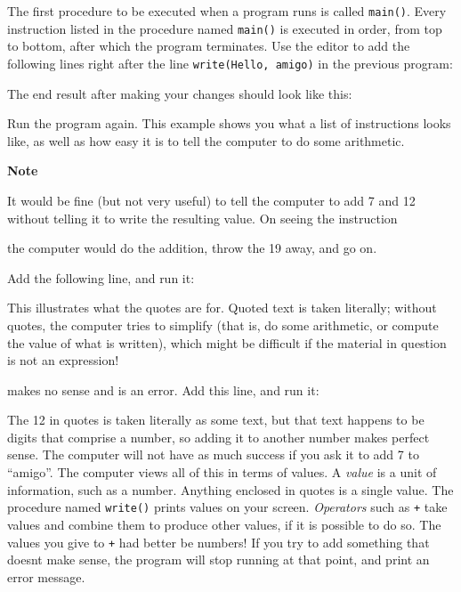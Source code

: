 The first procedure to be executed when a program runs is called
\texttt{main()}. Every instruction listed in the procedure named
\texttt{main()} is executed in order, from top to bottom, after which
the program terminates. Use the editor to add the following lines right
after the line \texttt{write({\textquotedbl}Hello,
amigo{\textquotedbl})} in the previous program:


\noindent The end result after making your changes should look like this:


Run the program again. This example shows you what a list of
instructions looks like, as well as how easy it is to tell the computer
to do some arithmetic.

{\sffamily\bfseries
Note}

{\sffamily
It would be fine (but not very useful) to tell the computer to add 7 and
12 without telling it to write the resulting value. On seeing the
instruction}


\noindent
the computer would do the addition, throw the 19 away, and go on.

Add the following line, and run it:


This illustrates what the quotes are for. Quoted text is taken
literally; without quotes, the computer tries to simplify (that is, do
some arithmetic, or compute the value of what is written), which might
be difficult if the material in question is not an expression!


\noindent makes no sense and is an error. Add this line, and run it:


The 12 in quotes is taken literally as some text, but that text happens
to be digits that comprise a number, so adding it to another number
makes perfect sense. The computer will not have as much success if you
ask it to add 7 to {\textquotedblleft}amigo{\textquotedblright}. The
computer views all of this in terms of values. A \textit{value} is a
unit of information, such as a number. Anything enclosed in quotes is a
single value. The procedure named \texttt{write()}
prints values on your screen. \textit{Operators} such as \texttt{+}
take values and combine them to produce other values, if it is possible
to do so. The values you give to \texttt{+} had better be numbers! If
you try to add something that doesn{\textquotesingle}t make sense, the
program will stop running at that point, and print an error message.

